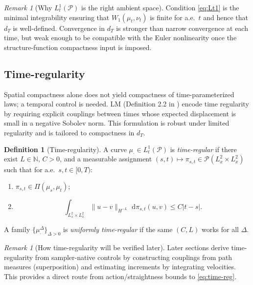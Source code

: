 \documentclass{article}
\numberwithin{equation}{section}
\theoremstyle{plain}
\theoremstyle{definition}
\newtheorem{definition}[theorem]{Definition}
\theoremstyle{remark}
\newtheorem{remark}[theorem]{Remark}
\newcommand{\N}{\mathbb{N}}
\newcommand{\Pcal}{\mathcal{P}}
\newcommand{\dd}{\,\mathrm{d}}
\begin{document}
\begin{remark}[Why $L^1_t(\Pcal)$ is the right ambient space]
Condition \eqref{eq:Lt1} is the minimal integrability ensuring that $W_1(\mu_t,\nu_t)$ is finite for a.e.\ $t$ and hence
that $d_T$ is well-defined. Convergence in $d_T$ is stronger than narrow convergence at each time, but weak enough to be
compatible with the Euler nonlinearity once the structure-function compactness input is imposed.
\end{remark}

\subsection{Time-regularity}

Spatial compactness alone does not yield compactness of time-parameterized laws; a temporal control is needed. LM (Definition 2.2 in \cite{LMP2021}) encode
time regularity by requiring explicit couplings between times whose expected displacement is small in a negative Sobolev
norm. This formulation is robust under limited regularity and is tailored to compactness in $d_T$.

\begin{definition}[Time-regularity]\label{def:time-regular}
A curve $\mu_\cdot\in L^1_t(\Pcal)$ is \emph{time-regular} if there exist $L\in\N$, $C>0$, and a measurable assignment
$(s,t)\mapsto\pi_{s,t}\in\Pcal(L^2_x\times L^2_x)$ such that for a.e.\ $s,t\in[0,T)$:
\begin{enumerate}[label=(\roman*),leftmargin=2.2em]
\item $\pi_{s,t}\in\Pi(\mu_s,\mu_t)$;
\item \begin{equation}\label{eq:time-reg}
\int_{L^2_x\times L^2_x}\|u-v\|_{H^{-L}}\,\dd\pi_{s,t}(u,v)\le C|t-s|.
\end{equation}
\end{enumerate}
A family $\{\mu^\Delta_\cdot\}_{\Delta>0}$ is \emph{uniformly time-regular} if the same $(C,L)$ works for all $\Delta$.
\end{definition}

\begin{remark}[How time-regularity will be verified later]
Later sections derive time-regularity from sampler-native controls by constructing couplings from path measures (superposition)
and estimating increments by integrating velocities. This provides a direct route from action/straightness bounds to
\eqref{eq:time-reg}.
\end{remark}
\end{document}
